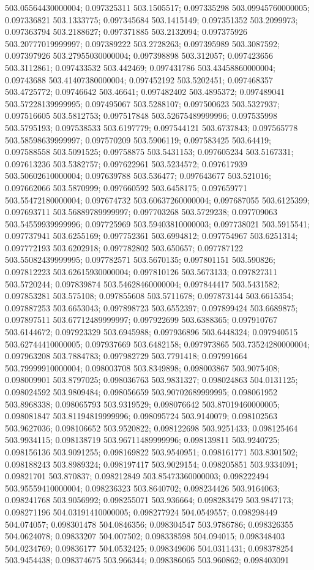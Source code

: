503.05564430000004; 0.097325311 503.1505517; 0.097335298 503.09945760000005; 0.097336821 503.1333775; 0.097345684 503.1415149; 0.097351352 503.2099973; 0.097363794 503.2188627; 0.097371885 503.2132094; 0.097375926 503.20777019999997; 0.097389222 503.2728263; 0.097395989 503.3087592; 0.097397926 503.27955030000004; 0.097398898 503.312057; 0.097423656 503.3112861; 0.097433532 503.442469; 0.097431786 503.43458860000004; 0.09743688 503.41407380000004; 0.097452192 503.5202451; 0.097468357 503.4725772; 0.09746642 503.46641; 0.097482402 503.4895372; 0.097489041 503.57228139999995; 0.097495067 503.5288107; 0.097500623 503.5327937; 0.097516605 503.5812753; 0.097517848 503.52675489999996; 0.097535998 503.5795193; 0.097538533 503.6197779; 0.097544121 503.6737843; 0.097565778 503.58598639999997; 0.097570209 503.5906119; 0.097583425 503.64419; 0.097588558 503.5091525; 0.09758875 503.5431153; 0.097605234 503.5167331; 0.097613236 503.5382757; 0.097622961 503.5234572; 0.097617939 503.50602610000004; 0.097639788 503.536477; 0.097643677 503.521016; 0.097662066 503.5870999; 0.097660592 503.6458175; 0.097659771 503.55472180000004; 0.097674732 503.60637260000004; 0.097687055 503.6125399; 0.097693711 503.56889789999997; 0.097703268 503.5729238; 0.097709063 503.54559939999996; 0.097725969 503.59403810000003; 0.097738021 503.5915541; 0.097737941 503.6255169; 0.097752361 503.6994812; 0.097754967 503.6251314; 0.097772193 503.6202918; 0.097782802 503.650657; 0.097787122 503.55082439999995; 0.097782571 503.5670135; 0.097801151 503.590826; 0.097812223 503.62615930000004; 0.097810126 503.5673133; 0.097827311 503.5720244; 0.097839874 503.54628460000004; 0.097844417 503.5431582; 0.097853281 503.575108; 0.097855608 503.5711678; 0.097873144 503.6615354; 0.097887253 503.6653043; 0.097898723 503.6552397; 0.097899424 503.6689875; 0.097897511 503.67712489999997; 0.097922699 503.6388365; 0.097910767 503.6144672; 0.097923329 503.6945988; 0.097936896 503.6448324; 0.097940515 503.62744410000005; 0.097937669 503.6482158; 0.097973865 503.73524280000004; 0.097963208 503.7884783; 0.097982729 503.7791418; 0.097991664 503.79999910000004; 0.098003708 503.8349898; 0.098003867 503.9075408; 0.098009901 503.8797025; 0.098036763 503.9831327; 0.098024863 504.0131125; 0.098024592 503.9809484; 0.098056659 503.90702689999995; 0.098061952 503.8968338; 0.098065793 503.9319529; 0.098076642 503.87019460000005; 0.098081847 503.81194819999996; 0.098095724 503.9140079; 0.098102563 503.9627036; 0.098106652 503.9520822; 0.098122698 503.9251433; 0.098125464 503.9934115; 0.098138719 503.96711489999996; 0.098139811 503.9240725; 0.098156136 503.9091255; 0.098169822 503.9540951; 0.098161771 503.8301502; 0.098188243 503.8989324; 0.098197417 503.9029154; 0.098205851 503.9334091; 0.09821701 503.870837; 0.098212849 503.85473360000003; 0.098222494 503.95559410000004; 0.098236323 503.8640702; 0.098234426 503.9164063; 0.098241768 503.9056992; 0.098255071 503.936664; 0.098283479 503.9847173; 0.098271196 504.03191410000005; 0.098277924 504.0549557; 0.098298449 504.074057; 0.098301478 504.0846356; 0.098304547 503.9786786; 0.098326355 504.0624078; 0.09833207 504.007502; 0.098338598 504.094015; 0.098348403 504.0234769; 0.09836177 504.0532425; 0.098349606 504.0311431; 0.098378254 503.9454438; 0.098374675 503.966344; 0.098386065 503.960862; 0.098403091 